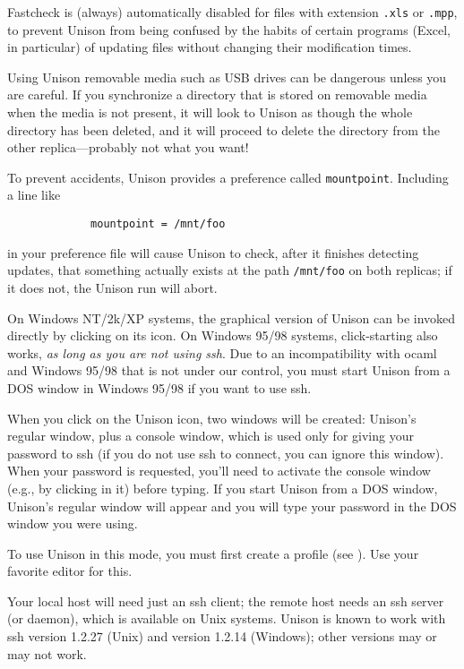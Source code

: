 \documentclass{article}
\begin{document}
Fastcheck is (always) automatically disabled for files with extension
\verb|.xls| or \verb|.mpp|, to prevent Unison from being confused by the 
habits of certain programs (Excel, in particular) of updating files without
changing their modification times.


Using Unison removable media such as USB drives can be dangerous unless you
are careful.  If you synchronize a directory that is stored on removable
media when the media is not present, it will look to Unison as though the
whole directory has been deleted, and it will proceed to delete the
directory from the other replica---probably not what you want!

To prevent accidents, Unison provides a preference called
\verb|mountpoint|.  Including a line like
\begin{verbatim}
             mountpoint = /mnt/foo
\end{verbatim}
in your preference file will cause Unison to check, after it finishes
detecting updates, that something actually exists at the path
\verb|/mnt/foo| on both replicas; if it does not, the Unison run will
abort. 


On Windows NT/2k/XP systems, the graphical version of Unison can be
invoked directly by clicking on its icon.  On Windows 95/98 systems,
click-starting also works, {\em as long as you are not using ssh}.
Due to an incompatibility with ocaml and Windows 95/98 that is not
under our control, you must start Unison from a DOS window in Windows
95/98 if you want to use ssh.

When you click on the Unison icon, two windows will be created:
Unison's regular window, plus a console window, which is used only for
giving your password to ssh (if you do not use ssh to connect, you can
ignore this window).  When your password is requested, you'll need to
activate the console window (e.g., by clicking in it) before typing.
If you start Unison from a DOS window, Unison's regular window will
appear and you will type your password in the DOS window you were
using.

To use Unison in this mode, you must first create a profile (see
).  Use your favorite editor for this.  


\appendix
{}

Your local host will need just an ssh client; the remote host needs an
ssh server (or daemon), which is available on Unix systems.  Unison is
known to work with ssh version 1.2.27 (Unix) and version 1.2.14
(Windows); other versions may or may not work.
\end{document}
